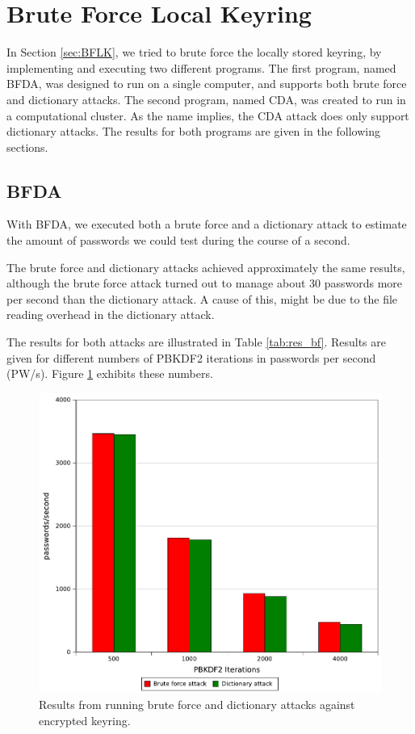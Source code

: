 \documentclass[pdftex,english,10pt,b5paper,twoside]{book}
\begin{document}
\section{Brute Force Local Keyring}
\label{sec:R:BFLK}
In Section \ref{sec:BFLK}, we tried to brute force the locally stored keyring,
by implementing and executing two different programs. The first program, named
\acf{BFDA}, was designed to run on a single computer, and supports both brute
force and dictionary attacks. The second program, named \acf{CDA}, was created
to run in a computational cluster. As the name implies, the \ac{CDA} attack
does only support dictionary attacks. The results for both programs are given
in the following sections.

\subsection{\acl{BFDA}}

With \ac{BFDA}, we executed both a brute force and a dictionary attack to
estimate the amount of passwords we could test during the course of a second.

The brute force and dictionary attacks achieved approximately the same results,
although the brute force attack turned out to manage about 30 passwords more
per second than the dictionary attack. A cause of this, might be due to the
file reading overhead in the dictionary attack. 

The results for both attacks are illustrated in Table \ref{tab:res_bf}. Results
are given for different numbers of \ac{PBKDF2} iterations in passwords per
second (PW/s). Figure \ref{fig:bfres} exhibits these numbers.



\begin{figure}[!h]
\centering
\includegraphics[scale=0.55]{graph_pbkdf2.pdf}
\caption{Results from running brute force and dictionary attacks against encrypted keyring.}
\label{fig:bfres}
\end{figure}
\end{document}
